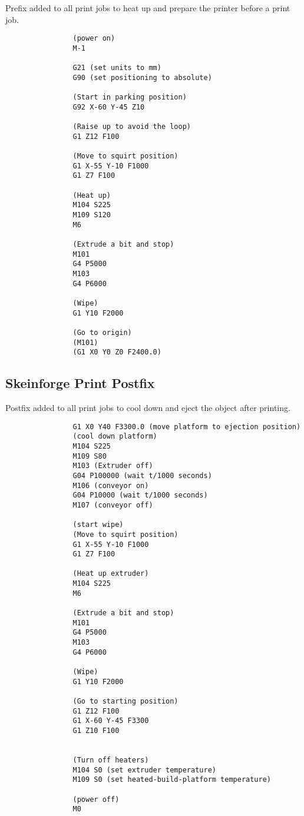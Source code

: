 			Prefix added to all print jobs to heat up and prepare the printer before a
			print job.
			
			\begin{verbatim}
				(power on)
				M-1
				
				G21 (set units to mm)
				G90 (set positioning to absolute)
				
				(Start in parking position)
				G92 X-60 Y-45 Z10
				
				(Raise up to avoid the loop)
				G1 Z12 F100
				
				(Move to squirt position)
				G1 X-55 Y-10 F1000
				G1 Z7 F100
				
				(Heat up)
				M104 S225
				M109 S120
				M6
				
				(Extrude a bit and stop)
				M101
				G4 P5000
				M103
				G4 P6000
				
				(Wipe)
				G1 Y10 F2000
				
				(Go to origin)
				(M101)
				(G1 X0 Y0 Z0 F2400.0)
			\end{verbatim}
		
		\subsection{Skeinforge Print Postfix}
			
			Postfix added to all print jobs to cool down and eject the object after
			printing.
			
			\begin{verbatim}
				G1 X0 Y40 F3300.0 (move platform to ejection position)
				(cool down platform)
				M104 S225
				M109 S80
				M103 (Extruder off)
				G04 P100000 (wait t/1000 seconds)
				M106 (conveyor on)
				G04 P10000 (wait t/1000 seconds)
				M107 (conveyor off)
				
				(start wipe)
				(Move to squirt position)
				G1 X-55 Y-10 F1000
				G1 Z7 F100
				
				(Heat up extruder)
				M104 S225
				M6
				
				(Extrude a bit and stop)
				M101
				G4 P5000
				M103
				G4 P6000
				
				(Wipe)
				G1 Y10 F2000
				
				(Go to starting position)
				G1 Z12 F100
				G1 X-60 Y-45 F3300
				G1 Z10 F100
				
				
				(Turn off heaters)
				M104 S0 (set extruder temperature)
				M109 S0 (set heated-build-platform temperature)
				
				(power off)
				M0
			\end{verbatim}
		

